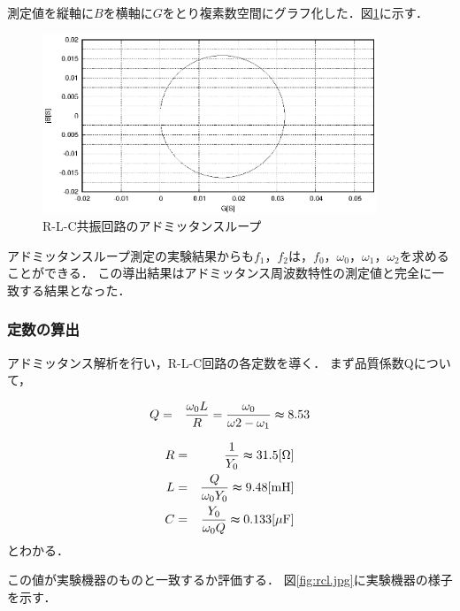 \documentclass[dvipdfmx,titlepage,a4j]{jsarticle}  %
\numberwithin{equation}{section}
\begin{document}
測定値を縦軸に$B$を横軸に$G$をとり複素数空間にグラフ化した．図\ref{fig:A_GB.eps}に示す．
\begin{figure}[H]
  \centering
  \includegraphics[width=10cm]{../gnuplot/A_GB.eps}
  \caption{R-L-C共振回路のアドミッタンスループ}
  \label{fig:A_GB.eps}
\end{figure}

アドミッタンスループ測定の実験結果からも$f_1$，$f_2$は，$f_0$，$\omega_0$，$\omega_1$，$\omega_2$を求めることができる．
この導出結果はアドミッタンス周波数特性の測定値と完全に一致する結果となった．

\subsubsection{定数の算出}
アドミッタンス解析を行い，R-L-C回路の各定数を導く．
まず品質係数Qについて，

\begin{eqnarray}
  Q &=& \frac{\omega_0 L}{R} = \frac{\omega_0}{\omega2 - \omega_1} \thickapprox 8.53\\
\end{eqnarray}

\begin{eqnarray}
  R &=& \frac{1}{Y_0} \thickapprox 31.5 \mathrm{[\Omega]}\\
  L &=& \frac{Q}{\omega_0 Y_0} \thickapprox 9.48 \mathrm{[mH]}\\
  C &=& \frac{Y_0}{\omega_0 Q} \thickapprox 0.133 \mathrm{[\mu F]}
\end{eqnarray}
とわかる．



この値が実験機器のものと一致するか評価する．
図\ref{fig:rcl.jpg}に実験機器の様子を示す．
\end{document}
